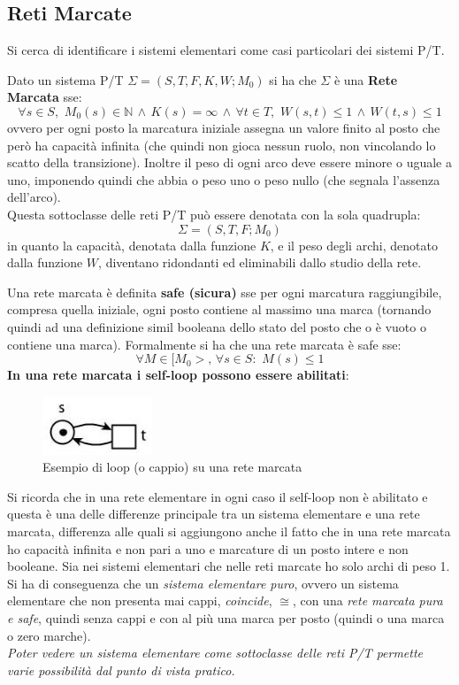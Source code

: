\documentclass[a4paper,12pt, oneside]{book}
\begin{document}
\subsection{Reti Marcate}
Si cerca di identificare i sistemi elementari come casi particolari dei sistemi
P/T.
\begin{definizione}
  Dato un sistema P/T $\Sigma=(S, T , F , K , W;M_0)$ si ha che $\Sigma$ è una
  \textbf{Rete Marcata} sse:
  \[\forall s\in S,\,\,M_0(s)\in\mathbb{N}\,\wedge \,K(s)=\infty
    \,\wedge\,\forall t\in T,\,\,W(s,t)\leq 1\,\wedge\, W(t,s)\leq 1 \]
  ovvero per ogni posto la marcatura iniziale assegna un valore finito al posto
  che però ha capacità infinita (che quindi non gioca nessun ruolo, non
  vincolando lo scatto della transizione). Inoltre il peso di ogni arco deve
  essere minore o uguale a uno, imponendo quindi che abbia o peso uno o peso
  nullo (che segnala l'assenza dell'arco).\\
  Questa sottoclasse delle reti P/T può essere denotata con la sola quadrupla:
  \[\Sigma=(S,T,F;M_0)\]
  in quanto la capacità, denotata dalla funzione $K$, e il peso degli archi,
  denotato dalla funzione $W$, diventano ridondanti ed eliminabili dallo studio
  della rete.
\end{definizione}
\begin{definizione}
  Una rete marcata è definita \textbf{safe (sicura)} sse per ogni marcatura
  raggiungibile, compresa quella iniziale, ogni posto contiene al massimo una
  marca (tornando quindi ad una definizione simil booleana dello stato del posto
  che o è vuoto o contiene una marca). Formalmente si ha che una rete marcata è
  safe sse: 
  \[\forall M\in[M_0>,\,\forall s\in S:\,\,M(s)\leq 1\]
  \textbf{In una rete marcata i self-loop possono essere abilitati}:
  \begin{figure}[H]
    \centering
    \includegraphics[scale = 0.75]{img/pt36.jpg}
    \caption{Esempio di loop (o cappio) su una rete marcata}
  \end{figure}
  Si ricorda che in una rete elementare in ogni caso il self-loop non è
  abilitato e questa è una delle differenze principale tra un sistema elementare
  e una rete marcata, differenza alle quali si aggiungono anche il fatto che in
  una rete marcata ho capacità infinita e non pari a uno e marcature di un posto
  intere e non booleane. Sia nei sistemi elementari che nelle reti marcate ho
  solo archi di peso 1. \\
  Si ha di conseguenza che un \emph{sistema elementare puro}, ovvero un sistema
  elementare che non presenta mai cappi, \emph{coincide}, $\cong$, con una
  \emph{rete marcata pura e safe}, quindi senza cappi e con al più una marca per
  posto (quindi o una marca o zero marche).
  \\
  \textit{Poter vedere un sistema elementare come sottoclasse delle reti P/T
    permette varie possibilità dal punto di vista pratico.}
\end{definizione}
\end{document}
